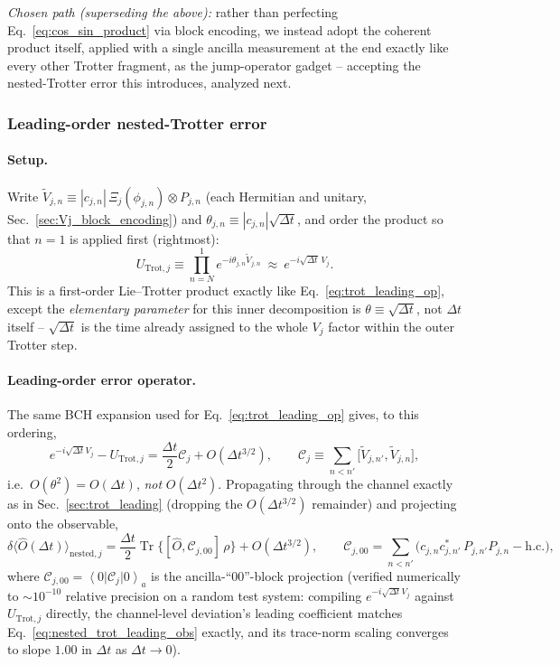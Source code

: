 \documentclass[11pt]{article}
\newcommand{\Dt}{\Delta t}
\newcommand{\calC}{\mathcal{C}}
\renewcommand{\ket}[1]{\left| #1 \right\rangle}
\renewcommand{\bra}[1]{\left\langle #1 \right|}
\DeclareMathOperator{\Tr}{Tr}
\begin{document}
\emph{Chosen path (superseding the above):} rather than perfecting Eq.~\eqref{eq:cos_sin_product} via block encoding, we instead adopt the coherent product itself, applied with a single ancilla measurement at the end exactly like every other Trotter fragment, as the jump-operator gadget -- accepting the nested-Trotter error this introduces, analyzed next.

\subsubsection{Leading-order nested-Trotter error}
\label{sec:nested_trot_leading}

\paragraph{Setup.} Write $\tilde V_{j,n}\equiv|c_{j,n}|\,\Xi_j(\phi_{j,n})\otimes P_{j,n}$ (each Hermitian and unitary, Sec.~\ref{sec:Vj_block_encoding}) and $\theta_{j,n}\equiv|c_{j,n}|\sqrt{\Dt}$, and order the product so that $n=1$ is applied first (rightmost):
\begin{equation}
    U_{\text{Trot},j} \equiv \prod_{n=N}^{1}e^{-i\theta_{j,n}\tilde V_{j,n}}\ \approx\ e^{-i\sqrt{\Dt}\,V_j}.
\end{equation}
This is a first-order Lie--Trotter product exactly like Eq.~\eqref{eq:trot_leading_op}, except the \emph{elementary parameter} for this inner decomposition is $\theta\equiv\sqrt{\Dt}$, not $\Dt$ itself -- $\sqrt{\Dt}$ is the time already assigned to the whole $V_j$ factor within the outer Trotter step.

\paragraph{Leading-order error operator.} The same BCH expansion used for Eq.~\eqref{eq:trot_leading_op} gives, to this ordering,
\begin{equation}
    e^{-i\sqrt{\Dt}V_j} - U_{\text{Trot},j} = \frac{\Dt}{2}\calC_j + O(\Dt^{3/2}),\qquad
    \calC_j \equiv \sum_{n<n'}\big[\tilde V_{j,n'},\tilde V_{j,n}\big],
\end{equation}
i.e.\ $O(\theta^2)=O(\Dt)$, \emph{not} $O(\Dt^2)$. Propagating through the channel exactly as in Sec.~\ref{sec:trot_leading} (dropping the $O(\Dt^{3/2})$ remainder) and projecting onto the observable,
\begin{equation}\label{eq:nested_trot_leading_obs}
    \delta\langle\hat{O}(\Dt)\rangle_{\text{nested},j} = \frac{\Dt}{2}\Tr\big\{[\hat{O},\calC_{j,00}]\,\rho\big\} + O(\Dt^{3/2}),\qquad
    \calC_{j,00} = \sum_{n<n'}\Big(c_{j,n}c_{j,n'}^*\,P_{j,n'}P_{j,n} - \text{h.c.}\Big),
\end{equation}
where $\calC_{j,00}=\bra{0}\calC_j\ket{0}_a$ is the ancilla-``00''-block projection (verified numerically to $\sim10^{-10}$ relative precision on a random test system: compiling $e^{-i\sqrt{\Dt}V_j}$ against $U_{\text{Trot},j}$ directly, the channel-level deviation's leading coefficient matches Eq.~\eqref{eq:nested_trot_leading_obs} exactly, and its trace-norm scaling converges to slope $1.00$ in $\Dt$ as $\Dt\to0$).
\end{document}
